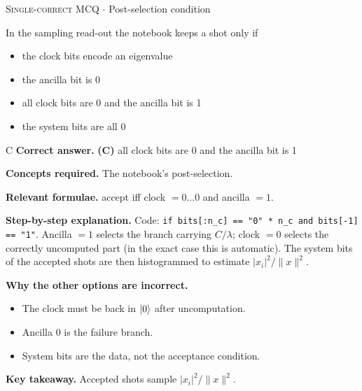 \documentclass[11pt,a4paper]{article}
\newcommand{\optlabel}[1]{\textbf{(#1)}}
\newcommand{\correctlabel}[1]{\textcolor{okgreen}{\textbf{(#1)}\,\ding{51}}}
\newenvironment{qitem}[1]{\begin{list}{}{\setlength{\leftmargin}{3.3em}\setlength{\labelwidth}{3.1em}%
  \setlength{\labelsep}{0.2em}\setlength{\topsep}{3pt}\setlength{\parsep}{3pt}}\item[\textbf{Q.#1}\hfill]}{\end{list}}
\newcommand{\qsep}{\par\vspace{2pt}{\color{black!15}\hrule}\vspace{4pt}}
\newcommand{\qmeta}[2]{{\footnotesize\color{black!60}\textsc{#1} \;$\cdot$\; #2}\par}
\begin{document}
\begin{qitem}{54}
\qmeta{Single-correct MCQ}{Post-selection condition}
In the sampling read-out the notebook keeps a shot only if
\begin{itemize}[leftmargin=2.6em, labelsep=0.4em, itemsep=2pt, topsep=3pt]
\item[\optlabel{A}] the clock bits encode an eigenvalue
\item[\optlabel{B}] the ancilla bit is 0
\item[\correctlabel{C}] all clock bits are 0 and the ancilla bit is 1
\item[\optlabel{D}] the system bits are all 0
\end{itemize}
\end{qitem}
\begin{solbox}{C}
\textbf{\color{brand}Correct answer.} \textcolor{okgreen}{\textbf{(C)}} all clock bits are 0 and the ancilla bit is 1

\textbf{\color{brand}Concepts required.} The notebook's post-selection.

\textbf{\color{brand}Relevant formulae.} accept iff clock $= 0\dots0$ and ancilla $= 1$.

\textbf{\color{brand}Step-by-step explanation.} Code: \texttt{if bits[:n\_c] == "0" * n\_c and bits[-1] == "1"}. Ancilla $= 1$ selects the branch carrying $C/\lambda$; clock $= 0$ selects the correctly uncomputed part (in the exact case
this is automatic). The system bits of the accepted shots are then histogrammed to estimate $|x_i|^2/\|x\|^2$.

\textbf{\color{brand}Why the other options are incorrect.}
\begin{itemize}[leftmargin=2.4em, itemsep=1pt, topsep=2pt]
\item[\textbf{(A)}] The clock must be back in $\ket0$ after uncomputation.
\item[\textbf{(B)}] Ancilla $0$ is the failure branch.
\item[\textbf{(D)}] System bits are the data, not the acceptance condition.
\end{itemize}
\textbf{\color{brand}Key takeaway.} Accepted shots sample $|x_i|^2/\|x\|^2$.
\end{solbox}
\qsep
\end{document}
